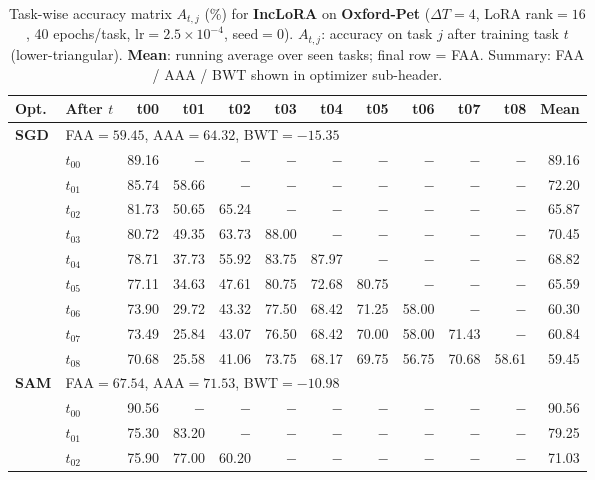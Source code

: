 \begin{table}[ht]
\centering
\caption{%
  Task-wise accuracy matrix $A_{t,j}$ (\%) for \textbf{IncLoRA} on \textbf{Oxford-Pet}
  ($\Delta T=4$, LoRA rank$=16$, 40 epochs/task, lr$=2.5\times10^{-4}$, seed$=0$).
  $A_{t,j}$: accuracy on task $j$ after training task $t$ (lower-triangular).
  \textbf{Mean}: running average over seen tasks; final row = FAA.
  Summary: FAA / AAA / BWT shown in optimizer sub-header.
}
\label{tab:raw_inclora_oxfordpet}
\setlength{\tabcolsep}{2.8pt}
\renewcommand{\arraystretch}{0.88}
\scriptsize
\begin{tabular}{@{}l l r r r r r r r r r r@{}}
\toprule
\textbf{Opt.} & \textbf{After $t$} & \textbf{t00} & \textbf{t01} & \textbf{t02} & \textbf{t03} & \textbf{t04} & \textbf{t05} & \textbf{t06} & \textbf{t07} & \textbf{t08} & \textbf{Mean} \\
\midrule
\multirow{10}{*}{\textbf{SGD}} & \multicolumn{11}{l}{\quad\small FAA$=59.45$,\; AAA$=64.32$,\; BWT$=-15.35$} \\
 & $t_{00}$ & 89.16 & $-$ & $-$ & $-$ & $-$ & $-$ & $-$ & $-$ & $-$ & 89.16 \\
 & $t_{01}$ & 85.74 & 58.66 & $-$ & $-$ & $-$ & $-$ & $-$ & $-$ & $-$ & 72.20 \\
 & $t_{02}$ & 81.73 & 50.65 & 65.24 & $-$ & $-$ & $-$ & $-$ & $-$ & $-$ & 65.87 \\
 & $t_{03}$ & 80.72 & 49.35 & 63.73 & 88.00 & $-$ & $-$ & $-$ & $-$ & $-$ & 70.45 \\
 & $t_{04}$ & 78.71 & 37.73 & 55.92 & 83.75 & 87.97 & $-$ & $-$ & $-$ & $-$ & 68.82 \\
 & $t_{05}$ & 77.11 & 34.63 & 47.61 & 80.75 & 72.68 & 80.75 & $-$ & $-$ & $-$ & 65.59 \\
 & $t_{06}$ & 73.90 & 29.72 & 43.32 & 77.50 & 68.42 & 71.25 & 58.00 & $-$ & $-$ & 60.30 \\
 & $t_{07}$ & 73.49 & 25.84 & 43.07 & 76.50 & 68.42 & 70.00 & 58.00 & 71.43 & $-$ & 60.84 \\
 & $t_{08}$ & 70.68 & 25.58 & 41.06 & 73.75 & 68.17 & 69.75 & 56.75 & 70.68 & 58.61 & 59.45 \\
\midrule
\multirow{10}{*}{\textbf{SAM}} & \multicolumn{11}{l}{\quad\small FAA$=67.54$,\; AAA$=71.53$,\; BWT$=-10.98$} \\
 & $t_{00}$ & 90.56 & $-$ & $-$ & $-$ & $-$ & $-$ & $-$ & $-$ & $-$ & 90.56 \\
 & $t_{01}$ & 75.30 & 83.20 & $-$ & $-$ & $-$ & $-$ & $-$ & $-$ & $-$ & 79.25 \\
 & $t_{02}$ & 75.90 & 77.00 & 60.20 & $-$ & $-$ & $-$ & $-$ & $-$ & $-$ & 71.03 \\

\end{tabular}
\end{table}
